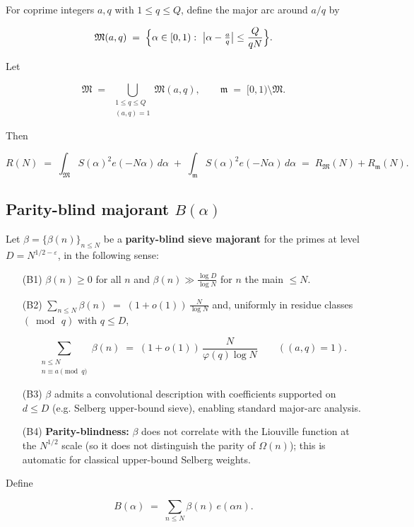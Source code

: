 \documentclass[11pt]{article}
\theoremstyle{definition}
\theoremstyle{remark}
\begin{document}
For coprime integers $a,q$ with $1\le q\le Q$, define the major arc around $a/q$ by

$$
	\mathfrak M(a,q)\;=\;\Bigl\{\alpha\in[0,1):\ \bigl|\alpha-\tfrac{a}{q}\bigr|
	\le \frac{Q}{qN}\Bigr\}.
$$

Let

$$
	\mathfrak M\;=\;\bigcup_{\substack{1\le q\le Q\\ (a,q)=1}}\mathfrak M(a,q),
	\qquad
	\mathfrak m\;=\;[0,1)\setminus\mathfrak M .
$$

Then

$$
	R(N)\;=\;\int_{\mathfrak M} S(\alpha)^2 e(-N\alpha)\,d\alpha\;+\;
	\int_{\mathfrak m} S(\alpha)^2 e(-N\alpha)\,d\alpha
	\;=\;R_{\mathfrak M}(N)+R_{\mathfrak m}(N).
$$


\subsection*{Parity-blind majorant $B(\alpha)$}

Let $\beta=\{\beta(n)\}_{n\le N}$ be a \textbf{parity-blind sieve majorant} for the primes at level $D=N^{1/2-\varepsilon}$, in the following sense:

\begin{itemize}[leftmargin=*]
	\item[(B1)] $\beta(n)\ge 0$ for all $n$ and $\beta(n)\gg \tfrac{\log D}{\log N}$ for $n$ the main $\le N$.
	\item[(B2)] $\displaystyle \sum_{n\le N}\beta(n)\;=\;(1+o(1))\,\frac{N}{\log N}$ and, uniformly in residue classes $(\bmod\,q)$ with $q\le D$,

	      $$
		      \sum_{\substack{n\le N\\ n\equiv a\!\!\!\pmod q}}\beta(n)
		      \;=\;(1+o(1))\,\frac{N}{\varphi(q)\log N}\qquad ((a,q)=1).
	      $$

	\item[(B3)] $\beta$ admits a convolutional description with coefficients supported on $d\le D$ (e.g. Selberg upper-bound sieve), enabling standard major-arc analysis.
	\item[(B4)] \textbf{Parity-blindness:} $\beta$ does not correlate with the Liouville function at the $N^{1/2}$ scale (so it does not distinguish the parity of $\Omega(n)$); this is automatic for classical upper-bound Selberg weights.
\end{itemize}

Define

$$
	B(\alpha)\;=\;\sum_{n\le N}\beta(n)\,e(\alpha n).
$$
\end{document}
